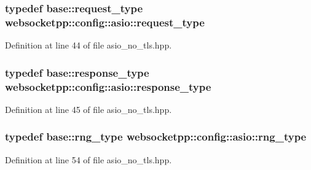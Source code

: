 \hypertarget{structwebsocketpp_1_1config_1_1asio_ab378f1fa9cdbf4736b0202666c9abe53}{}
\subsubsection[{request\+\_\+type}]{\setlength{\rightskip}{0pt plus 5cm}typedef {\bf base\+::request\+\_\+type} {\bf websocketpp\+::config\+::asio\+::request\+\_\+type}}\label{structwebsocketpp_1_1config_1_1asio_ab378f1fa9cdbf4736b0202666c9abe53}


Definition at line 44 of file asio\+\_\+no\+\_\+tls.\+hpp.

\hypertarget{structwebsocketpp_1_1config_1_1asio_a2336ebfd28c36b1e66257ae57ad5296c}{}
\subsubsection[{response\+\_\+type}]{\setlength{\rightskip}{0pt plus 5cm}typedef {\bf base\+::response\+\_\+type} {\bf websocketpp\+::config\+::asio\+::response\+\_\+type}}\label{structwebsocketpp_1_1config_1_1asio_a2336ebfd28c36b1e66257ae57ad5296c}


Definition at line 45 of file asio\+\_\+no\+\_\+tls.\+hpp.

\hypertarget{structwebsocketpp_1_1config_1_1asio_afb20244eb1c988b20a5821ec04ac4f80}{}
\subsubsection[{rng\+\_\+type}]{\setlength{\rightskip}{0pt plus 5cm}typedef {\bf base\+::rng\+\_\+type} {\bf websocketpp\+::config\+::asio\+::rng\+\_\+type}}\label{structwebsocketpp_1_1config_1_1asio_afb20244eb1c988b20a5821ec04ac4f80}


Definition at line 54 of file asio\+\_\+no\+\_\+tls.\+hpp.

\hypertarget{structwebsocketpp_1_1config_1_1asio_af600118e4ba565fa6e5063490e9e7047}{}
